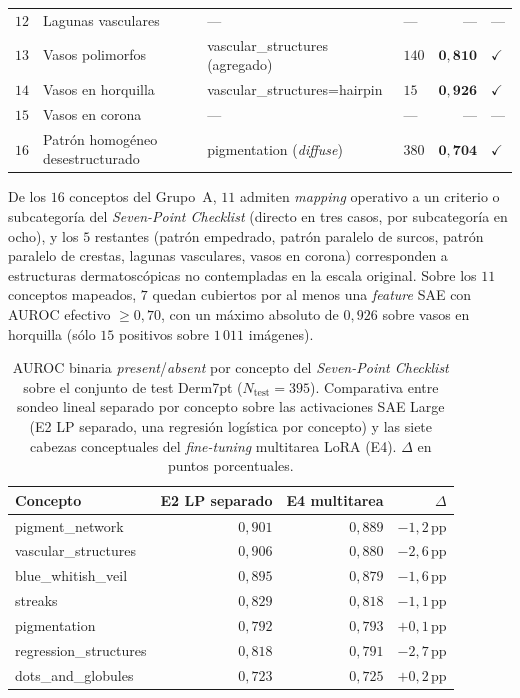 \begin{table}[H]
{\begin{tabular}{rlllrl}
$12$ & Lagunas vasculares                   & ---                                  & ---   & ---                 & --- \\
$13$ & Vasos polimorfos                     & vascular\_structures (agregado)     & $140$ & $\mathbf{0{,}810}$  & $\checkmark$ \\
$14$ & Vasos en horquilla                   & vascular\_structures=hairpin        & $15$  & $\mathbf{0{,}926}$  & $\checkmark$ \\
$15$ & Vasos en corona                      & ---                                  & ---   & ---                 & --- \\
$16$ & Patrón homogéneo desestructurado     & pigmentation (\emph{diffuse})       & $380$ & $\mathbf{0{,}704}$  & $\checkmark$ \\
\hline
\end{tabular}}
\end{table}

De los $16$ conceptos del Grupo~A, $11$ admiten \emph{mapping}
operativo a un criterio o subcategoría del \emph{Seven-Point
Checklist} (directo en tres casos, por subcategoría en ocho), y
los $5$ restantes (patrón empedrado, patrón paralelo de surcos,
patrón paralelo de crestas, lagunas vasculares, vasos en corona)
corresponden a estructuras dermatoscópicas no contempladas en la
escala original. Sobre los $11$ conceptos mapeados, $7$ quedan
cubiertos por al menos una \emph{feature} SAE con AUROC efectivo
$\geq 0{,}70$, con un máximo absoluto de $0{,}926$ sobre vasos en
horquilla (sólo $15$ positivos sobre $1\,011$ imágenes).

\begin{table}[H]
\centering
\footnotesize
\setlength{\tabcolsep}{4pt}
\renewcommand{\arraystretch}{0.95}
\caption{AUROC binaria \emph{present}/\emph{absent} por concepto
del \emph{Seven-Point Checklist} sobre el conjunto de test
Derm7pt ($N_{\mathrm{test}} = 395$). Comparativa entre sondeo
lineal separado por concepto sobre las activaciones SAE Large
(E2 LP separado, una regresión logística por concepto) y las
siete cabezas conceptuales del \emph{fine-tuning} multitarea
LoRA (E4). $\Delta$ en puntos porcentuales.}
\label{tab:sae-d7pt-e4-concepts}
\begin{tabular}{lrrr}
\hline
Concepto                & E2 LP separado & E4 multitarea & $\Delta$ \\
\hline
pigment\_network        & $0{,}901$ & $0{,}889$ & $-1{,}2$\,pp \\
vascular\_structures    & $0{,}906$ & $0{,}880$ & $-2{,}6$\,pp \\
blue\_whitish\_veil     & $0{,}895$ & $0{,}879$ & $-1{,}6$\,pp \\
streaks                 & $0{,}829$ & $0{,}818$ & $-1{,}1$\,pp \\
pigmentation            & $0{,}792$ & $0{,}793$ & $+0{,}1$\,pp \\
regression\_structures  & $0{,}818$ & $0{,}791$ & $-2{,}7$\,pp \\
dots\_and\_globules     & $0{,}723$ & $0{,}725$ & $+0{,}2$\,pp \\
\hline
\end{tabular}
\end{table}


